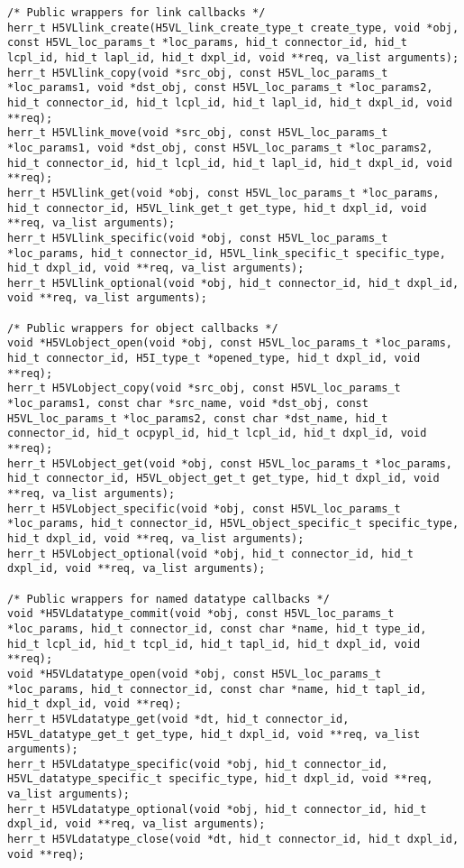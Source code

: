 \begin{appendices}
\begin{lstlisting}
/* Public wrappers for link callbacks */
herr_t H5VLlink_create(H5VL_link_create_type_t create_type, void *obj, const H5VL_loc_params_t *loc_params, hid_t connector_id, hid_t lcpl_id, hid_t lapl_id, hid_t dxpl_id, void **req, va_list arguments);
herr_t H5VLlink_copy(void *src_obj, const H5VL_loc_params_t *loc_params1, void *dst_obj, const H5VL_loc_params_t *loc_params2, hid_t connector_id, hid_t lcpl_id, hid_t lapl_id, hid_t dxpl_id, void **req);
herr_t H5VLlink_move(void *src_obj, const H5VL_loc_params_t *loc_params1, void *dst_obj, const H5VL_loc_params_t *loc_params2, hid_t connector_id, hid_t lcpl_id, hid_t lapl_id, hid_t dxpl_id, void **req);
herr_t H5VLlink_get(void *obj, const H5VL_loc_params_t *loc_params, hid_t connector_id, H5VL_link_get_t get_type, hid_t dxpl_id, void **req, va_list arguments);
herr_t H5VLlink_specific(void *obj, const H5VL_loc_params_t *loc_params, hid_t connector_id, H5VL_link_specific_t specific_type, hid_t dxpl_id, void **req, va_list arguments);
herr_t H5VLlink_optional(void *obj, hid_t connector_id, hid_t dxpl_id, void **req, va_list arguments);

/* Public wrappers for object callbacks */
void *H5VLobject_open(void *obj, const H5VL_loc_params_t *loc_params, hid_t connector_id, H5I_type_t *opened_type, hid_t dxpl_id, void **req);
herr_t H5VLobject_copy(void *src_obj, const H5VL_loc_params_t *loc_params1, const char *src_name, void *dst_obj, const H5VL_loc_params_t *loc_params2, const char *dst_name, hid_t connector_id, hid_t ocpypl_id, hid_t lcpl_id, hid_t dxpl_id, void **req);
herr_t H5VLobject_get(void *obj, const H5VL_loc_params_t *loc_params, hid_t connector_id, H5VL_object_get_t get_type, hid_t dxpl_id, void **req, va_list arguments);
herr_t H5VLobject_specific(void *obj, const H5VL_loc_params_t *loc_params, hid_t connector_id, H5VL_object_specific_t specific_type, hid_t dxpl_id, void **req, va_list arguments);
herr_t H5VLobject_optional(void *obj, hid_t connector_id, hid_t dxpl_id, void **req, va_list arguments);

/* Public wrappers for named datatype callbacks */                               
void *H5VLdatatype_commit(void *obj, const H5VL_loc_params_t *loc_params, hid_t connector_id, const char *name, hid_t type_id, hid_t lcpl_id, hid_t tcpl_id, hid_t tapl_id, hid_t dxpl_id, void **req);
void *H5VLdatatype_open(void *obj, const H5VL_loc_params_t *loc_params, hid_t connector_id, const char *name, hid_t tapl_id, hid_t dxpl_id, void **req);
herr_t H5VLdatatype_get(void *dt, hid_t connector_id, H5VL_datatype_get_t get_type, hid_t dxpl_id, void **req, va_list arguments);
herr_t H5VLdatatype_specific(void *obj, hid_t connector_id, H5VL_datatype_specific_t specific_type, hid_t dxpl_id, void **req, va_list arguments);
herr_t H5VLdatatype_optional(void *obj, hid_t connector_id, hid_t dxpl_id, void **req, va_list arguments);
herr_t H5VLdatatype_close(void *dt, hid_t connector_id, hid_t dxpl_id, void **req);
                                                                                 

\end{lstlisting}
\end{appendices}
